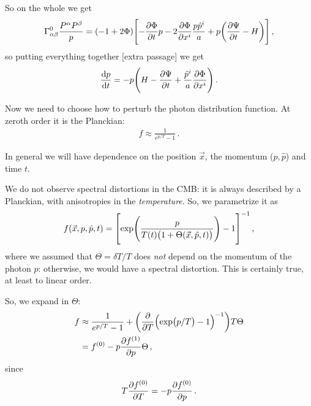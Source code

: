 \documentclass[main.tex]{subfiles}
\begin{document}
So on the whole we get 
%
\begin{align}
\Gamma^{0}_{\alpha \beta } \frac{P^{\alpha } P^{\beta }}{p } = 
(-1 + 2 \Phi ) \qty[
- \pdv{\Phi }{t} p - 2 \pdv{\Phi }{x^{i}}
\frac{p \hat{p}^{i}}{a} + p \qty(\pdv{\Psi }{t} - H)
]
\,,
\end{align}
%
so putting everything together 
[extra passage]
we get 
%
\begin{align}
\dv{p}{t} = -p \qty(H - \pdv{\Psi }{t} + \frac{\hat{p}^{i}}{a} \pdv{\Phi }{x^{i}})
\,.
\end{align}

Now we need to choose how to perturb the photon distribution function. At zeroth order it is the Planckian: 
%
\begin{align}
f \approx \frac{1}{e^{p/T} - 1} 
\,.
\end{align}

In general we will have dependence on the position \(\vec{x}\), the momentum (\(p, \hat{p}\)) and time \(t\). 

We do not observe spectral distortions in the CMB: it is always described by a Planckian, with anisotropies in the \emph{temperature}. So, we parametrize it as 
%
\begin{align}
f(\vec{x}, p, \hat{p}, t) 
= \qty[\exp(\frac{p}{T(t) \qty(1 + \Theta (\vec{x}, \hat{p}, t))}) - 1]^{-1}
\,,
\end{align}
%
where we assumed that \(\Theta = \delta T / T\) does \emph{not} depend on the momentum of the photon \(p\): otherwise, we would have a spectral distortion. 
This is certainly true, at least to linear order. 

So, we expand in \(\Theta\): 
%
\begin{align}
f &\approx \frac{1}{e^{p/T}-1}
 + \qty(\pdv{}{T} \qty(\exp(p/T)-1)^{-1}) T \Theta  \\
 &= f^{(0)} - p \pdv{f^{(1)}}{p} \Theta 
\,,
\end{align}
%
since 
%
\begin{align}
T \pdv{f^{(0)}}{T} = - p \pdv{f^{(0)}}{p}
\,.
\end{align}
\end{document}
